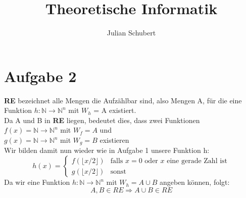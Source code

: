 \documentclass[14pt]{article}
\title{Theoretische Informatik}
\author{Julian Schubert}
\begin{document}
\section*{Aufgabe 2}
\textbf{RE} bezeichnet alle Mengen die Aufzählbar sind, also Mengen A, für die
eine Funktion $h: \mathbb{N} \rightarrow \mathbb{N}^n$ mit $W_h$ = A existiert. \\
Da A und B in \textbf{RE} liegen, bedeutet dies, dass zwei Funktionen \\
$f(x) = \mathbb{N} \rightarrow \mathbb{N}^n$ mit $W_f = A$ und \\
$g(x) = \mathbb{N} \rightarrow \mathbb{N}^n$ mit $W_g = B$ existieren \\
Wir bilden damit nun wieder wie in Aufgabe 1 unsere Funktion h: \\
\begin{equation*}
    h(x) =
    \begin{cases}
        f(\lfloor x / 2\rfloor)                 & \text{falls $x = 0$ oder $x$ eine 
        gerade Zahl ist} \\
        g(\lfloor x / 2\rfloor)                 & \text{sonst}             
    \end{cases}
\end{equation*}
Da wir eine Funktion $h: \mathbb{N} \rightarrow \mathbb{N}^n$ mit $W_h = A \cup B$
angeben können, folgt: 
\[
    A, B \in RE \Rightarrow A \cup B \in RE 
\] 
\end{document}
